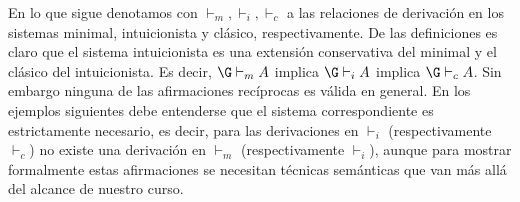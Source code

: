 \documentclass[11pt,letterpaper]{article}
\begin{document}
En lo que sigue denotamos con $\vdash_m,\vdash_i,\vdash_c$ a las
relaciones de derivación en los sistemas minimal, intuicionista y clásico, 
respectivamente.
De las definiciones es claro que el sistema intuicionista es una
extensión conservativa del minimal y el clásico del intuicionista. Es
decir, $\G\vdash_m A$ implica $\G\vdash_i A$ implica $\G\vdash_c A$. Sin
embargo ninguna de las afirmaciones recíprocas es válida en
general. En los ejemplos siguientes debe entenderse que el sistema
correspondiente es estrictamente necesario, es decir,  para las
derivaciones en $\vdash_i$ (respectivamente $\vdash_c$) no existe una 
derivación en $\vdash_m$ (respectivamente $\vdash_i$), aunque para mostrar 
formalmente estas afirmaciones se necesitan técnicas semánticas que van más
allá del alcance de nuestro curso.


\end{document}
